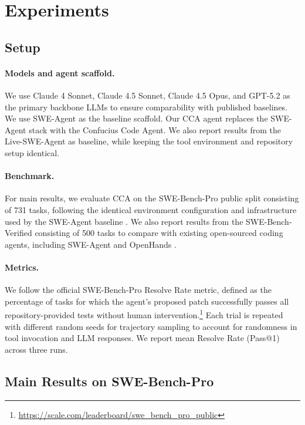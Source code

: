 \section{Experiments}

\subsection{Setup}

\paragraph{Models and agent scaffold.}
We use Claude 4 Sonnet, Claude 4.5 Sonnet, Claude 4.5 Opus, and GPT-5.2 as the primary backbone LLMs to ensure comparability with published baselines. We use SWE-Agent \citep{sweagent} as the baseline scaffold. Our CCA agent replaces the SWE-Agent stack with the Confucius Code Agent.
We also report results from the Live-SWE-Agent \citep{xia2025live} as baseline, while keeping the tool environment and repository setup identical. 

\paragraph{Benchmark.}
For main results, we evaluate CCA on the SWE-Bench-Pro \citep{sbp} public split consisting of 731 tasks, following the identical environment configuration and infrastructure used by the SWE-Agent baseline \citep{sweagent}. We also report results from the SWE-Bench-Verified \citep{swebench} consisting of 500 tasks to compare with existing open-sourced coding agents, including SWE-Agent and OpenHands \citep{openhands}.

\paragraph{Metrics.}
We follow the official SWE-Bench-Pro Resolve Rate metric, defined as the percentage of tasks for which the agent’s proposed patch successfully passes all repository-provided tests without human intervention.\footnote{\url{https://scale.com/leaderboard/swe_bench_pro_public}} Each trial is repeated with different random seeds for trajectory sampling to account for randomness in tool invocation and LLM responses. We report mean Resolve Rate (Pass@1) across three runs.

\subsection{Main Results on SWE-Bench-Pro}

